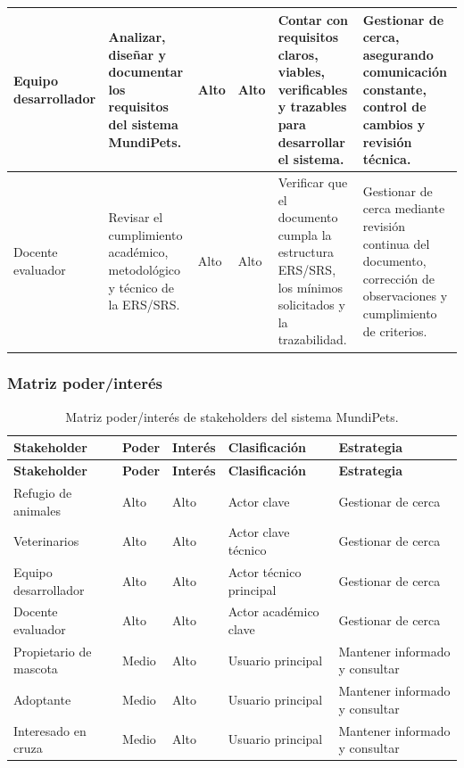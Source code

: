 \documentclass[journal,onecolumn]{IEEEtran}
\begin{document}
\begin{longtable}{|p{1.8cm}|p{2.4cm}|p{1cm}|p{1cm}|p{3.7cm}|p{3.6cm}|}
		Equipo desarrollador & Analizar, diseñar y documentar los requisitos del sistema MundiPets. & Alto & Alto & Contar con requisitos claros, viables, verificables y trazables para desarrollar el sistema. & Gestionar de cerca, asegurando comunicación constante, control de cambios y revisión técnica. \\ \hline
		
		Docente evaluador & Revisar el cumplimiento académico, metodológico y técnico de la ERS/SRS. & Alto & Alto & Verificar que el documento cumpla la estructura ERS/SRS, los mínimos solicitados y la trazabilidad. & Gestionar de cerca mediante revisión continua del documento, corrección de observaciones y cumplimiento de criterios. \\ \hline
	\end{longtable}
	
	\subsubsection{Matriz poder/interés}
	\label{sec:poder-interes}
	
	\begin{longtable}{|p{3.0cm}|p{1.4cm}|p{1.4cm}|p{3.8cm}|p{4.2cm}|}
		\caption{Matriz poder/interés de stakeholders del sistema MundiPets.} \label{tab:clasificacion_stakeholders} \\
		\hline
		\textbf{Stakeholder} & \textbf{Poder} & \textbf{Interés} & \textbf{Clasificación} & \textbf{Estrategia} \\
		\hline
		\endfirsthead
		\hline
		\textbf{Stakeholder} & \textbf{Poder} & \textbf{Interés} & \textbf{Clasificación} & \textbf{Estrategia} \\
		\hline
		\endhead
		\hline
		\endfoot
		\hline
		\endlastfoot
		
		Refugio de animales & Alto & Alto & Actor clave & Gestionar de cerca \\ \hline
		
		Veterinarios & Alto & Alto & Actor clave técnico & Gestionar de cerca \\ \hline
		
		Equipo desarrollador & Alto & Alto & Actor técnico principal & Gestionar de cerca \\ \hline
		
		Docente evaluador & Alto & Alto & Actor académico clave & Gestionar de cerca \\ \hline
		
		Propietario de mascota & Medio & Alto & Usuario principal & Mantener informado y consultar \\ \hline
		
		Adoptante & Medio & Alto & Usuario principal & Mantener informado y consultar \\ \hline
		
		Interesado en cruza & Medio & Alto & Usuario principal & Mantener informado y consultar \\ \hline
	\end{longtable}
	
\end{document}
